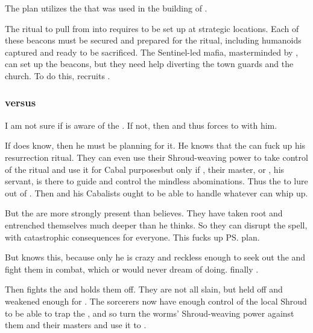 The plan utilizes the  that was used in the building of \Malcur.

The ritual to pull \Nithdornazsh{} from  into \Miith{} requires  to be set up at strategic locations. 
Each of these beacons must be secured and prepared for the ritual, including humanoids captured and ready to be sacrificed. 
The Sentinel-led mafia, masterminded by \Psyrex, can set up the beacons, but they need help diverting the town guards and the church. 
To do this, \Psyrex{} recruits . 





\subsubsection{\Secherdamon versus \noggyaleth}
I am not sure if  is aware of the \noggyaleth. 
If not, then  and thus forces \Secherdamon{} to \cooperate{} with him.

If \Secherdamon{} does know, then he must be planning for it. 
He knows that the \noggyaleth{} can fuck up his resurrection ritual. 
They can even use their Shroud-weaving power to take control of the ritual and use it for Cabal purposes\dash but only if \Teshrial, their master, or \Achsah, his servant, is there to guide and control the mindless abominations. 
Thus the  to lure \Achsah{} out of \Malcur.
Then \LocarPsyrex{} and his Cabalists ought to be able to handle whatever \Teshrial{} can whip up. 

But the \noggyaleth{} are more strongly present than \Secherdamon{} believes. 
They have taken root and entrenched themselves much deeper than he thinks. 
So they can disrupt the spell, with catastrophic consequences for everyone. 
This fucks up \ps{\Secherdamon} plan. 

But \Ishnaruchaefir{} knows this, because only he is crazy and reckless enough to seek out the \noggyaleth{} and fight them in \melee{} combat, which \Secherdamon{} or \LocarPsyrex{} would never dream of doing. 
\Ishnaruchaefir{} finally . 

Then \Ishnaruchaefir{} fights the \noggyaleth{} and holds them off. 
They are not all slain, but held off and weakened enough for . The sorcerers now have enough control of the local Shroud to be able to trap the \noggyaleth, and so turn the worms' Shroud-weaving power against them and their masters and use it to . 

